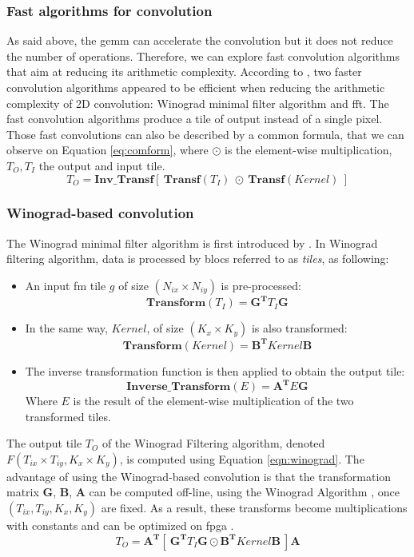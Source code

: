 \subsubsection{Fast algorithms for convolution}
%
%
As said above, the \acrshort{gemm} can accelerate the convolution but it does not reduce the number of operations. Therefore, we can explore fast convolution algorithms that aim at reducing its arithmetic complexity. According to \textcite{liang_evaluating_2020}, two faster convolution algorithms appeared to be efficient when reducing the arithmetic complexity of 2D convolution: Winograd minimal filter algorithm and \acrfull{fft}. The fast convolution algorithms produce a tile of output instead of a single pixel. Those fast convolutions can also be described by a common formula, that we can observe on Equation \ref{eq:comform}, where $\odot$ is the element-wise multiplication, $T_O, T_I$ the output and input tile.
%
\begin{equation}
    T_O = \boldsymbol{Inv\_Transf} [ \ \boldsymbol{Transf}(T_I) \ \odot \ \boldsymbol{Transf}(Kernel) \ ]
    \label{eq:comform}
\end{equation}
%
\subsubsection{Winograd-based convolution}
%
The Winograd minimal filter algorithm is first introduced by \cite{winograd_arithmetic_1980}. In Winograd filtering algorithm, data is processed by blocs referred to as \textit{tiles}, as following:
\begin{itemize}
    \item An input \acrshort{fm} tile $g$ of size $(N_{ix} \times N_{iy})$ is pre-processed: $$\boldsymbol{Transform}(T_I) = \boldsymbol{G^{T}} T_I \boldsymbol{G} $$
    \item In the same way, $Kernel$, of size $(K_x \times K_y)$ is also transformed: $$\boldsymbol{Transform}(Kernel) = \boldsymbol{B^{T}} Kernel \boldsymbol{B}$$
    \item The inverse transformation function is then applied to obtain the output tile: $$\boldsymbol{Inverse\_Transform}(E) = \boldsymbol{A^{T}} E \boldsymbol{G}$$ Where $E$ is the result of the element-wise multiplication of the two transformed tiles.
\end{itemize}
The output tile $T_O$ of the Winograd Filtering algorithm, denoted $F(T_{ix} \times T_{iy}, K_x \times K_y)$, is computed using Equation \eqref{eqn:winograd}. The advantage of using the Winograd-based convolution is that the transformation matrix $\boldsymbol{G}$, $\boldsymbol{B}$, $\boldsymbol{A}$ can be computed off-line, using the Winograd Algorithm \cite{winograd_arithmetic_1980}, once $(T_{ix}, T_{iy}, K_x, K_y)$ are fixed. As a result, these transforms become multiplications with constants and can be optimized on \acrshort{fpga} \cite{liang_evaluating_2020}.
%
\begin{equation}
    T_O = \boldsymbol{A^{T}} [ \ \boldsymbol{G^{T}} T_I \boldsymbol{G} \odot \boldsymbol{B^{T}} Kernel \boldsymbol{B} \ ] \boldsymbol{A}
    \label{eqn:winograd}
\end{equation}


